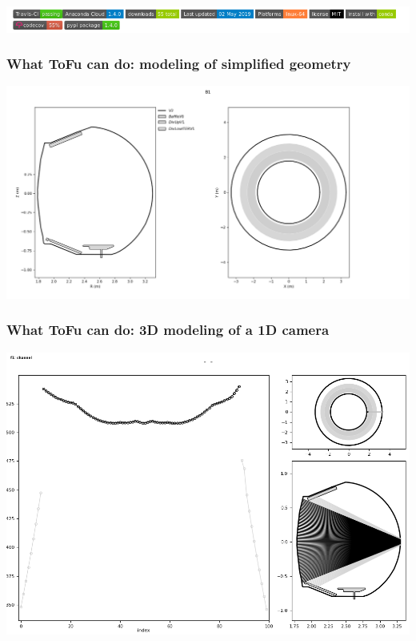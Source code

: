 \documentclass[10pt]{beamer}
\begin{document}
\begin{frame}
\begin{columns}
\begin{column}{0.35\textwidth}
\begin{center}
\end{center}
\end{column}
\end{columns}
\begin{center}
    	\includegraphics[width=\textwidth]{figures/badges.png}
\end{center}

\end{frame}



\begin{frame}
\frametitle{What ToFu can do: modeling of simplified geometry}
	\begin{center}
		\includegraphics[width=\textwidth,trim={0 0 4cm 0}]{figures/geom_B2.png}
	\end{center}
\end{frame}

\begin{frame}
\frametitle{What ToFu can do: 3D modeling of a 1D camera}
		\begin{center}
		\includegraphics[width=\textwidth]{figures/cam1d.png}
	\end{center}
\end{frame}
\end{document}
